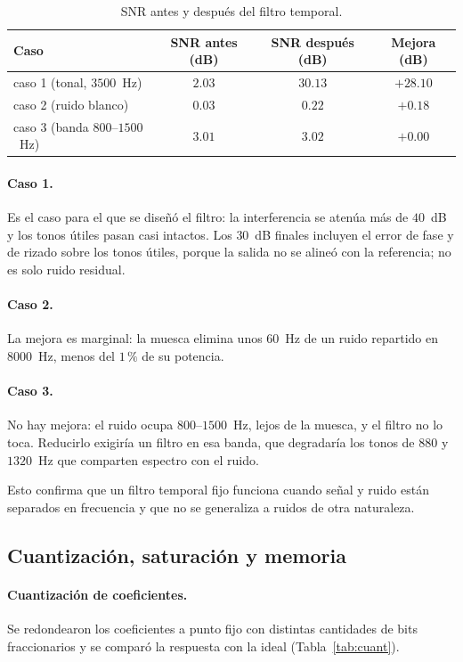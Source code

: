 \begin{table}[h]
\centering
\begin{tabular}{|l|c|c|c|}
\hline
\textbf{Caso} & \textbf{SNR antes (dB)} & \textbf{SNR después (dB)} & \textbf{Mejora (dB)} \\ \hline
caso 1 (tonal, $3500$~Hz) & $2.03$ & $30.13$ & $+28.10$ \\ \hline
caso 2 (ruido blanco) & $0.03$ & $0.22$ & $+0.18$ \\ \hline
caso 3 (banda $800$--$1500$~Hz) & $3.01$ & $3.02$ & $+0.00$ \\ \hline
\end{tabular}
\caption{SNR antes y después del filtro temporal.}
\label{tab:snr}
\end{table}

\paragraph{Caso 1.} Es el caso para el que se diseñó el filtro: la interferencia se atenúa más de $40$~dB y los tonos útiles pasan casi intactos. Los $30$~dB finales incluyen el error de fase y de rizado sobre los tonos útiles, porque la salida no se alineó con la referencia; no es solo ruido residual.

\paragraph{Caso 2.} La mejora es marginal: la muesca elimina unos $60$~Hz de un ruido repartido en $8000$~Hz, menos del $1\,\%$ de su potencia.

\paragraph{Caso 3.} No hay mejora: el ruido ocupa $800$--$1500$~Hz, lejos de la muesca, y el filtro no lo toca. Reducirlo exigiría un filtro en esa banda, que degradaría los tonos de $880$ y $1320$~Hz que comparten espectro con el ruido.

Esto confirma que un filtro temporal fijo funciona cuando señal y ruido están separados en frecuencia y que no se generaliza a ruidos de otra naturaleza.

\subsection{Cuantización, saturación y memoria}
\label{sec:cuant}

\paragraph{Cuantización de coeficientes.} Se redondearon los coeficientes a punto fijo con distintas cantidades de bits fraccionarios y se comparó la respuesta con la ideal (Tabla~\ref{tab:cuant}).

